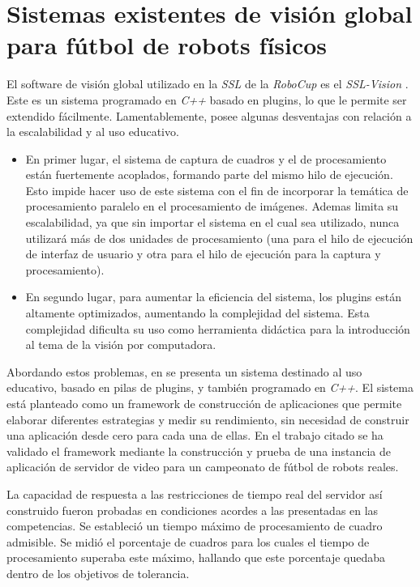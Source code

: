 
\section{Sistemas existentes de visión global para fútbol de robots físicos}

\label{svgExistentes}

El software de visión global utilizado en la \emph{SSL} de la \emph{RoboCup} es
el \emph{SSL-Vision} \cite{sslvision}. Este es un sistema programado en
\emph{C++} basado en plugins, lo que le permite ser extendido fácilmente.
Lamentablemente, posee algunas desventajas con relación a la escalabilidad y al
uso educativo.

\begin{itemize}

	\item 	En primer lugar, el sistema de captura de cuadros y el de
		procesamiento están fuertemente acoplados, formando parte del
		mismo hilo de ejecución. Esto impide hacer uso de este sistema
		con el fin de incorporar la temática de procesamiento paralelo
		en el procesamiento de imágenes. Ademas limita su escalabilidad,
		ya que sin importar el sistema en el cual sea utilizado, nunca
		utilizará más de dos unidades de procesamiento (una para el hilo
		de ejecución de interfaz de usuario y otra para el hilo de
		ejecución para la captura y procesamiento).

	\item 	En segundo lugar, para aumentar la eficiencia del sistema, los
		plugins están altamente optimizados, aumentando la complejidad
		del sistema. Esta complejidad dificulta su uso como herramienta
		didáctica para la introducción al tema de la visión por
		computadora.

\end{itemize}

Abordando estos problemas, en \cite{torres2014} se presenta un sistema destinado
al uso educativo, basado en pilas de plugins, y también programado en
\emph{C++}. El sistema está planteado como un framework de construcción de
aplicaciones que permite elaborar diferentes estrategias y medir su rendimiento,
sin necesidad de construir una aplicación desde cero para cada una de ellas. En
el trabajo citado se ha validado el framework mediante la construcción y prueba
de una instancia de aplicación de servidor de video para un campeonato de fútbol
de robots reales.

La capacidad de respuesta a las restricciones de tiempo real del servidor así
construido fueron probadas en condiciones acordes a las presentadas en las
competencias. Se estableció un tiempo máximo de procesamiento de cuadro
admisible. Se midió el porcentaje de cuadros para los cuales el tiempo de
procesamiento superaba este máximo, hallando que este porcentaje quedaba dentro
de los objetivos de tolerancia.

